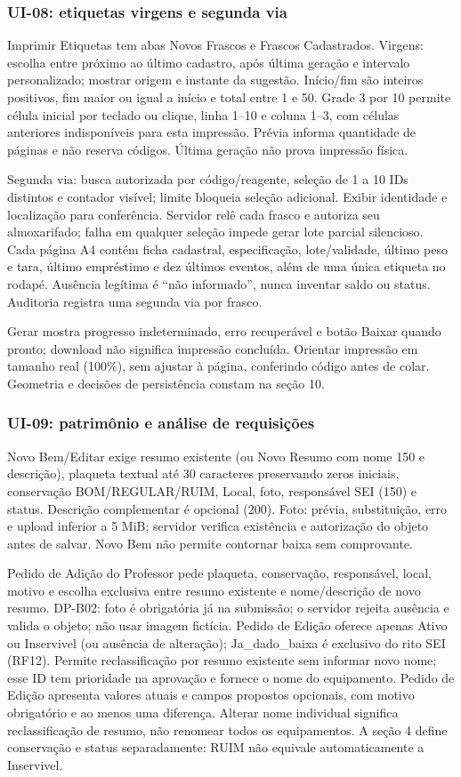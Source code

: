 \subsubsection{UI-08: etiquetas virgens e segunda via}
Imprimir Etiquetas tem abas Novos Frascos e Frascos Cadastrados. Virgens: escolha entre próximo ao último cadastro, após última geração e intervalo personalizado; mostrar origem e instante da sugestão. Início/fim são inteiros positivos, fim maior ou igual a início e total entre 1 e 50. Grade 3 por 10 permite célula inicial por teclado ou clique, linha 1--10 e coluna 1--3, com células anteriores indisponíveis para esta impressão. Prévia informa quantidade de páginas e não reserva códigos. Última geração não prova impressão física.

Segunda via: busca autorizada por código/reagente, seleção de 1 a 10 IDs distintos e contador visível; limite bloqueia seleção adicional. Exibir identidade e localização para conferência. Servidor relê cada frasco e autoriza seu almoxarifado; falha em qualquer seleção impede gerar lote parcial silencioso. Cada página A4 contém ficha cadastral, especificação, lote/validade, último peso e tara, último empréstimo e dez últimos eventos, além de uma única etiqueta no rodapé. Ausência legítima é ``não informado'', nunca inventar saldo ou status. Auditoria registra uma segunda via por frasco.

Gerar mostra progresso indeterminado, erro recuperável e botão Baixar quando pronto; download não significa impressão concluída. Orientar impressão em tamanho real (100\%), sem ajustar à página, conferindo código antes de colar. Geometria e decisões de persistência constam na seção 10.

\subsubsection{UI-09: patrimônio e análise de requisições}
Novo Bem/Editar exige resumo existente (ou Novo Resumo com nome 150 e descrição), plaqueta textual até 30 caracteres preservando zeros iniciais, conservação BOM/REGULAR/RUIM, Local, foto, responsável SEI (150) e status. Descrição complementar é opcional (200). Foto: prévia, substituição, erro e upload inferior a 5 MiB; servidor verifica existência e autorização do objeto antes de salvar. Novo Bem não permite contornar baixa sem comprovante.

Pedido de Adição do Professor pede plaqueta, conservação, responsável, local, motivo e escolha exclusiva entre resumo existente e nome/descrição de novo resumo. DP-B02: foto é obrigatória já na submissão; o servidor rejeita ausência e valida o objeto; não usar imagem fictícia. Pedido de Edição oferece apenas Ativo ou Inservivel (ou ausência de alteração); Ja\_dado\_baixa é exclusivo do rito SEI (RF12). Permite reclassificação por resumo existente sem informar novo nome; esse ID tem prioridade na aprovação e fornece o nome do equipamento. Pedido de Edição apresenta valores atuais e campos propostos opcionais, com motivo obrigatório e ao menos uma diferença. Alterar nome individual significa reclassificação de resumo, não renomear todos os equipamentos. A seção 4 define conservação e status separadamente: RUIM não equivale automaticamente a Inservivel.


